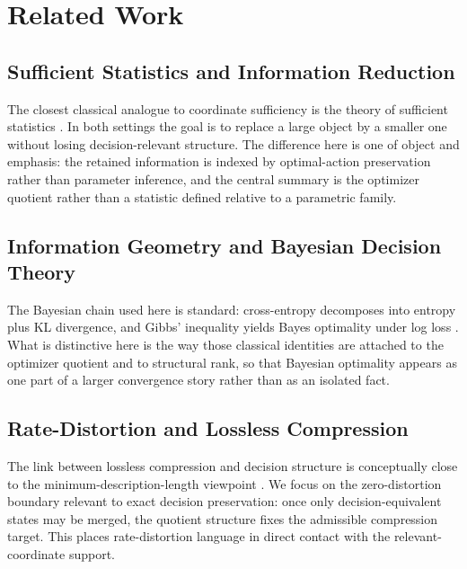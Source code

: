 \section{Related Work}\label{sec:related}

\subsection{Sufficient Statistics and Information Reduction}

The closest classical analogue to coordinate sufficiency is the theory of sufficient statistics \cite{cover2006elements,csiszar2011information,savage1954foundations}. In both settings the goal is to replace a large object by a smaller one without losing decision-relevant structure. The difference here is one of object and emphasis: the retained information is indexed by optimal-action preservation rather than parameter inference, and the central summary is the optimizer quotient rather than a statistic defined relative to a parametric family.

\subsection{Information Geometry and Bayesian Decision Theory}

The Bayesian chain used here is standard: cross-entropy decomposes into entropy plus KL divergence, and Gibbs' inequality yields Bayes optimality under log loss \cite{cover2006elements,csiszar2011information,raiffa1961applied}. What is distinctive here is the way those classical identities are attached to the optimizer quotient and to structural rank, so that Bayesian optimality appears as one part of a larger convergence story rather than as an isolated fact.

\subsection{Rate-Distortion and Lossless Compression}

The link between lossless compression and decision structure is conceptually close to the minimum-description-length viewpoint \cite{shannon1959coding,blahut1972computation,rissanen1978modeling,grunwald2007minimum}. We focus on the zero-distortion boundary relevant to exact decision preservation: once only decision-equivalent states may be merged, the quotient structure fixes the admissible compression target. This places rate-distortion language in direct contact with the relevant-coordinate support.

